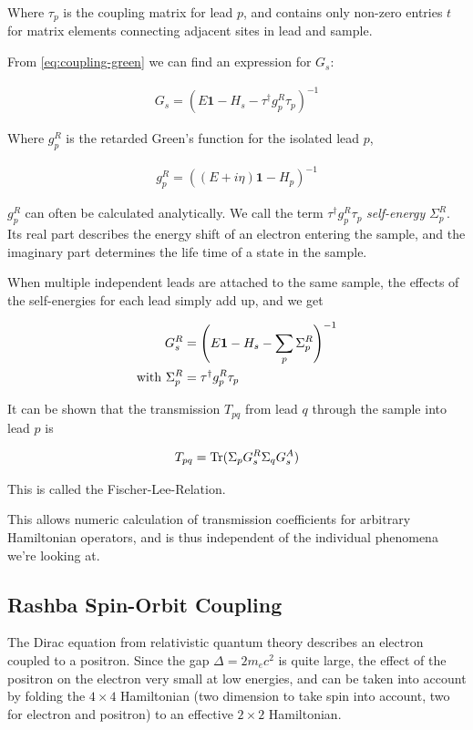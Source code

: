 \documentclass[11pt]{report}
\newcommand{\trace}{\textnormal{Tr}}
\begin{document}
Where $\tau_p$ is the coupling matrix for lead $p$, and contains only non-zero
entries $t$ for matrix elements connecting adjacent sites in lead and sample.

From \ref{eq:coupling-green} we can find an expression for $G_s$:

\begin{align}
    G_s = (E\mathbf1 - H_s - \tau^\dagger g_p^R \tau_p )^{-1}
\end{align}

Where $g_p^R$ is the retarded Green's function for the isolated lead $p$,

\begin{align}
    g_p^R = ((E+i\eta)\mathbf1 - H_p)^{-1}
\end{align}

$g_p^R$ can often be calculated analytically. We call the term $\tau^\dagger
g_p^R \tau_p$ \emph{self-energy} $\Sigma^R_p$. Its real part describes the
energy shift of an electron entering the sample, and the imaginary part
determines the life time of a state in the sample.

When multiple independent leads are attached
to the same sample, the effects of the self-energies for each lead simply add
up, and we get

\begin{align}
    G_s^R &= \left(E\mathbf1 - H_s - \sum_p \Sigma^R_p\right)^{-1} \\
    \textnormal{with } \Sigma^R_p &= \tau^\dagger g_p^R \tau_p
\end{align}

It can be shown \cite{fischer-lee,baranger} that the transmission $T_{pq}$ from lead
$q$ through the sample into lead $p$ is

\begin{align}
    T_{pq} = \trace(\Sigma_p G_s^R \Sigma_q G_s^A)
\end{align}

This is called the Fischer-Lee-Relation.

This allows numeric calculation of transmission coefficients for
arbitrary Hamiltonian operators, and is thus independent of the individual
phenomena we're looking at.

\subsection*{Rashba Spin-Orbit Coupling}

The Dirac equation from relativistic quantum theory describes an electron
coupled to a positron. Since the gap $\Delta = 2 m_e c^2$ is quite large, the
effect of the positron on the electron very small at low energies, and can be
taken into account by folding the $4\times4$ Hamiltonian (two dimension to
take spin into account, two for electron and positron) to an effective
$2\times 2$ Hamiltonian.
\end{document}
